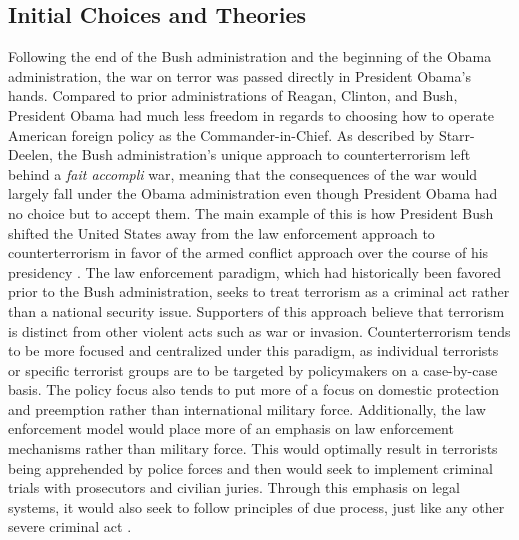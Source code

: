 \documentclass[12pt]{article}
\begin{document}
\subsection*{Initial Choices and Theories}
Following the end of the Bush administration and the beginning of the Obama administration, the war on terror was passed directly in President Obama's hands.
Compared to prior administrations of Reagan, Clinton, and Bush, President Obama had much less freedom in regards to choosing how to operate American foreign policy as the Commander-in-Chief.
As described by Starr-Deelen, the Bush administration's unique approach to counterterrorism left behind a \textit{fait accompli} war, meaning that the consequences of the war would largely fall under the Obama administration even though President Obama had no choice but to accept them.
The main example of this is how President Bush shifted the United States away from the law enforcement approach to counterterrorism in favor of the armed conflict approach over the course of his presidency \autocite[2]{starr-deelen2018}.
The law enforcement paradigm, which had historically been favored prior to the Bush administration, seeks to treat terrorism as a criminal act rather than a national security issue.
Supporters of this approach believe that terrorism is distinct from other violent acts such as war or invasion.
Counterterrorism tends to be more focused and centralized under this paradigm, as individual terrorists or specific terrorist groups are to be targeted by policymakers on a case-by-case basis.
The policy focus also tends to put more of a focus on domestic protection and preemption rather than international military force.
Additionally, the law enforcement model would place more of an emphasis on law enforcement mechanisms rather than military force.
This would optimally result in terrorists being apprehended by police forces and then would seek to implement criminal trials with prosecutors and civilian juries.
Through this emphasis on legal systems, it would also seek to follow principles of due process, just like any other severe criminal act \autocite[3]{starr-deelen2018}.
\end{document}
